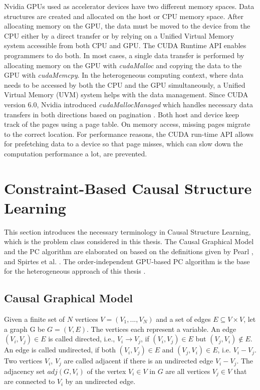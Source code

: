 Nvidia GPUs used as accelerator devices have two different memory spaces. Data structures are created and allocated on the host or CPU memory space. After allocating memory on the GPU, the data must be moved to the device from the CPU either by a direct transfer or by relying on a Unified Virtual Memory system accessible from both CPU and GPU. The CUDA Runtime API enables programmers to do both. In most cases, a single data transfer is performed by allocating memory on the GPU with \emph{cudaMalloc} and copying the data to the GPU with \emph{cudaMemcpy}. In the heterogeneous computing context, where data needs to be accessed by both the CPU and the GPU simultaneously, a Unified Virtual Memory (UVM) system helps with the data management. Since CUDA version 6.0, Nvidia introduced \emph{cudaMallocManaged} which handles necessary data transfers in both directions based on pagination \cite{gayatriComparingManagedMemory}. Both host and device keep track of the pages using a page table. On memory access, missing pages migrate to the correct location.
For performance reasons, the CUDA run-time API allows for prefetching data to a device so that page misses, which can slow down the computation performance a lot, are prevented.


\section{Constraint-Based Causal Structure Learning}
\label{sec:cbcsl}
This section introduces the necessary terminology in Causal Structure Learning, which is the problem class considered in this thesis. The Causal Graphical Model and the PC algorithm are elaborated on based on the definitions given by Pearl \cite{pearlCausality2009}, and Spirtes et al. \cite{spirtesCausationPredictionSearch1993}. The order-independent GPU-based PC algorithm is the base for the heterogeneous approach of this thesis \cite{schmidtOrderIndependentConstraintBasedCausal2018}.

\subsection{Causal Graphical Model}
Given a finite set of $N$ vertices $V = (V_1,...,V_N)$ and a set of edges $E \subseteq V \times V$, let a graph G be $G = (V,E)$. The vertices each represent a variable. An edge $(V_i, V_j) \in E$ is called directed, i.e., $V_i \rightarrow V_j$, if $(V_i,V_j) \in E$ but $(V_j, V_i) \notin E$. An edge is called undirected, if both $(V_i,V_j) \in E$ and $(V_j, V_i) \in E$, i.e. $V_i - V_j$. Two vertices $V_i$, $V_j$ are called adjacent if there is an undirected edge $V_i - V_j$. The adjacency set $adj(G, V_i)$ of the vertex $V_i \in V$ in $G$ are all vertices $V_j \in V$ that are connected to $V_i$ by an undirected edge.

